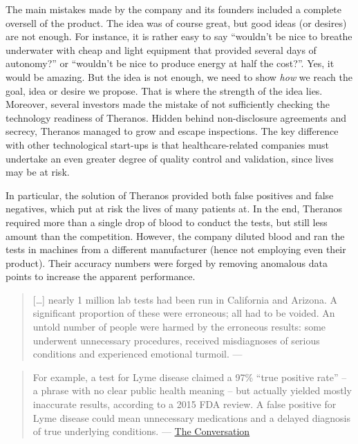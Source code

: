 \documentclass[
]{book}
\begin{document}
The main mistakes made by the company and its founders included a complete oversell of the product. The idea was of course great, but good ideas (or desires) are not enough. For instance, it is rather easy to say ``wouldn't be nice to breathe underwater with cheap and light equipment that provided several days of autonomy?'' or ``wouldn't be nice to produce energy at half the cost?''. Yes, it would be amazing. But the idea is not enough, we need to show \emph{how} we reach the goal, idea or desire we propose. That is where the strength of the idea lies. Moreover, several investors made the mistake of not sufficiently checking the technology readiness of Theranos. Hidden behind non-disclosure agreements and secrecy, Theranos managed to grow and escape inspections. The key difference with other technological start-ups is that healthcare-related companies must undertake an even greater degree of quality control and validation, since lives may be at risk.

In particular, the solution of Theranos provided both false positives and false negatives, which put at risk the lives of many patients at. In the end, Theranos required more than a single drop of blood to conduct the tests, but still less amount than the competition. However, the company diluted blood and ran the tests in machines from a different manufacturer (hence not employing even their product). Their accuracy numbers were forged by removing anomalous data points to increase the apparent performance.

\begin{quote}
{[}\ldots{]} nearly 1 million lab tests had been run in California and Arizona. A significant proportion of these were erroneous; all had to be voided. An untold number of people were harmed by the erroneous results: some underwent unnecessary procedures, received misdiagnoses of serious conditions and experienced emotional turmoil. --- \citep{topol2018blood}
\end{quote}

\begin{quote}
For example, a test for Lyme disease claimed a 97\% ``true positive rate'' -- a phrase with no clear public health meaning -- but actually yielded mostly inaccurate results, according to a 2015 FDA review. A false positive for Lyme disease could mean unnecessary medications and a delayed diagnosis of true underlying conditions. --- \href{https://theconversation.com/how-theranos-faulty-blood-tests-got-to-market-and-what-that-shows-about-gaps-in-fda-regulation-168050}{The Conversation}
\end{quote}
\end{document}
